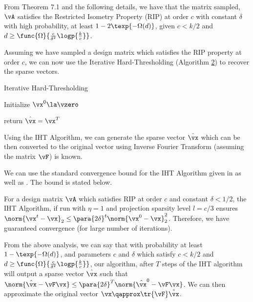 \documentclass{article}
\begin{document}
\begin{question}
\begin{enumerate}[label=\bt{\arabic*.}]
			From Theorem 7.1 \citep{puru} and the following details, we have that the matrix sampled, \ie $\vA$ satisfies the Restricted Isometry Property (RIP) at order $c$ with constant $\delta$ with high probability, \ie at least $1 - 2 \texp{- \Omega(d)}$, given $c < k / 2$ and $d \ge \func{\Omega}{\frac{c}{\delta^2} \logp{\frac{k}{c}}}$.


			Assuming we have sampled a design matrix which satisfies the RIP property at order $c$, we can now use the Iterative Hard-Thresholding (Algorithm \hyperlink{algo:2}{2}) \citep{puru, iht} to recover the sparse vectors.

			\begin{algo}[0.9\textwidth]{Iterative Hard-Thresholding}
				\begin{algorithm}[H]
					\IncMargin{1em}
					\Indm
					\Indp
					Initialize $\vx^0 \la \vzero$


					return $\hat{\vx} = \vx^{T}$
				\end{algorithm}

			\end{algo}

			Using the IHT Algorithm, we can generate the sparse vector $\hat{\vx}$ which can be then converted to the original vector using Inverse Fourier Transform (assuming the matrix $\vF$) is known.

			We can use the standard convergence bound for the IHT Algorithm given in \cite{iht} as well as \cite{puru}. The bound is stated below.

			For a design matrix $\vA$ which satisfies RIP at order $c$ and constant $\delta < 1 / 2$, the IHT Algorithm, if run with $\eta = 1$ and projection sparsity level $l = c / 3$ ensures $\norm{\vx^t - \vx}_2 \le \para{2 \delta}^t \norm{\vx^0 - \vx}_2^2$. Therefore, we have guaranteed convergence (for large number of iterations).
	\end{enumerate}

	From the above analysis, we can say that with probability at least $1 - \texp{- \Omega(d)}$, and parameters $c$ and $\delta$ which satisfy $c < k / 2$ and $d \ge \func{\Omega}{\frac{c}{\delta^2}\logp{\frac{k}{c}}}$, our algorithm, after $T$ steps of the IHT algorithm will output a sparse vector $\hat{\vx}$ such that $\norm{\hat{\vx} - \vF \vx} \le \para{2 \delta}^{T} \norm{\hat{\vx}^0 - \vF \vx}$. We can then approximate the original vector $\vx \qapprox \tr{\vF} \hat{\vx}$.

\end{question}
\end{document}
